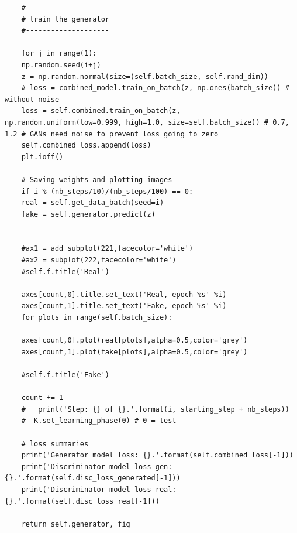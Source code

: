\begin{lstlisting}
	#--------------------
	# train the generator
	#--------------------
	
	for j in range(1):
	np.random.seed(i+j)
	z = np.random.normal(size=(self.batch_size, self.rand_dim))
	# loss = combined_model.train_on_batch(z, np.ones(batch_size)) # without noise
	loss = self.combined.train_on_batch(z, np.random.uniform(low=0.999, high=1.0, size=self.batch_size)) # 0.7, 1.2 # GANs need noise to prevent loss going to zero
	self.combined_loss.append(loss)
	plt.ioff()
	
	# Saving weights and plotting images
	if i % (nb_steps/10)/(nb_steps/100) == 0:
	real = self.get_data_batch(seed=i)
	fake = self.generator.predict(z)
	
	
	#ax1 = add_subplot(221,facecolor='white')
	#ax2 = subplot(222,facecolor='white')
	#self.f.title('Real')
	
	axes[count,0].title.set_text('Real, epoch %s' %i)
	axes[count,1].title.set_text('Fake, epoch %s' %i)
	for plots in range(self.batch_size):
	
	axes[count,0].plot(real[plots],alpha=0.5,color='grey') 
	axes[count,1].plot(fake[plots],alpha=0.5,color='grey') 
	
	#self.f.title('Fake')
	
	count += 1
	#   print('Step: {} of {}.'.format(i, starting_step + nb_steps))
	#  K.set_learning_phase(0) # 0 = test
	
	# loss summaries      
	print('Generator model loss: {}.'.format(self.combined_loss[-1]))
	print('Discriminator model loss gen: {}.'.format(self.disc_loss_generated[-1]))
	print('Discriminator model loss real: {}.'.format(self.disc_loss_real[-1]))
	
	return self.generator, fig

\end{lstlisting}

